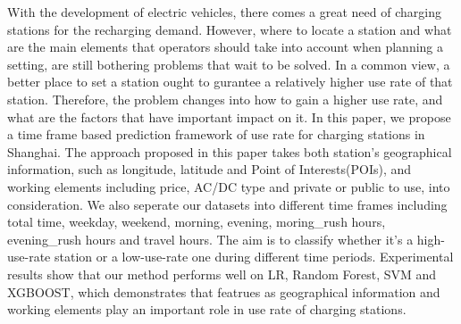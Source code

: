 With the development of electric vehicles, there comes a great need of charging stations for the recharging demand. However, where to locate a station and what are the main elements that operators should take into account when planning a setting, are still bothering problems that wait to be solved. In a common view, a better place to set a station ought to gurantee a relatively higher use rate of that station. Therefore, the problem changes into how to gain a higher use rate, and what are the factors that have important impact on it. In this paper, we propose a time frame based prediction framework of use rate for charging stations in Shanghai. The approach proposed in this paper takes both station's geographical information, such as longitude, latitude and Point of Interests(POIs), and working elements including price, AC/DC type and private or public to use, into consideration. We also seperate our datasets into different time frames including total time, weekday, weekend, morning, evening, moring\_rush hours, evening\_rush hours and travel hours. The aim is to classify whether it's a high-use-rate station or a low-use-rate one during different time periods. Experimental results show that our method performs well on LR, Random Forest, SVM and XGBOOST, which demonstrates that featrues as geographical information and working elements play an important role in use rate of charging stations.
